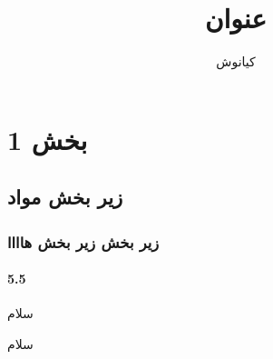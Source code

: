 \documentclass[a4paper,10pt]{article}
\title{عنوان}
\author{کیانوش}
\date{}
\begin{document}
    \maketitle
    \tableofcontents
    \newpage

    \section{بخش 1}

    \subsection{زیر بخش مواد}

    \subsubsection{زیر بخش زیر بخش هاااا}

    \paragraph{5.5}{سلام}

    سلام
\end{document}
